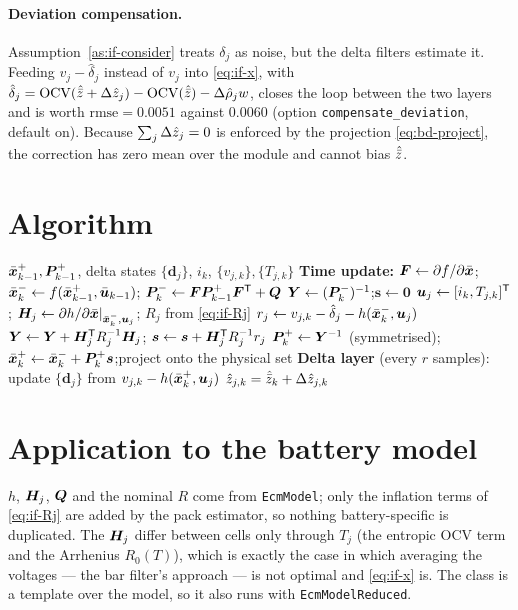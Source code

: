 \paragraph{Deviation compensation.} Assumption~\ref{as:if-consider} treats $\delta_j$ as noise,
but the delta filters estimate it. Feeding
$v_j - \hat\delta_j$ instead of $v_j$ into \eqref{eq:if-x}, with
$\hat\delta_j = \mathrm{OCV}(\hat{\bar{z}}+\Delta\hat{z}_j)-\mathrm{OCV}(\hat{\bar{z}}) -
\Delta\hat\rho_j w$, closes the loop between the two layers and is worth
$\text{rmse}=\num{0.0051}$ against \num{0.0060} (option
\texttt{compensate\_deviation}, default on). Because
$\sum_j\Delta\hat{z}_j = 0$ is enforced by the projection \eqref{eq:bd-project}, the correction
has zero mean over the module and cannot bias $\hat{\bar{z}}$.

\section{Algorithm}
\begin{algorithm}[H]
\caption{InfoFusion --- one sampling period $k$}
\begin{algorithmic}[1]
\Require $\bar{\bm{x}}^+_{k-1},\bm{P}^{+}_{k-1}$, delta states $\{\bm{d}_j\}$, $i_k$, $\{v_{j,k}\},\{T_{j,k}\}$
\State \textbf{Time update:} $\bm{F}\gets\partial f/\partial\bar{\bm{x}}$;\;
 $\bar{\bm{x}}^-_k\gets f(\bar{\bm{x}}^+_{k-1},\bar{\bm{u}}_{k-1})$;\; $\bm{P}^{-}_k\gets\bm{F}\bm{P}^{+}_{k-1}\bm{F}^{\mathsf{T}}+\bm{Q}$
\State $\bm{Y}\gets(\bm{P}^{-}_k)^{-1}$;\quad $\bm{s}\gets\bm{0}$
  \State $\bm{u}_j\gets[i_k,T_{j,k}]^{\mathsf{T}}$;\; $\bm{H}_j\gets\partial h/\partial\bar{\bm{x}}|_{\bar{\bm{x}}^-_k,\bm{u}_j}$;\;
         $R_j$ from \eqref{eq:if-Rj}
  \State $r_j \gets v_{j,k} - \hat\delta_{j} - h(\bar{\bm{x}}^-_k,\bm{u}_j)$
  \State $\bm{Y}\gets\bm{Y} + \bm{H}_j^{\mathsf{T}} R_j^{-1}\bm{H}_j$;\quad
         $\bm{s}\gets\bm{s} + \bm{H}_j^{\mathsf{T}} R_j^{-1} r_j$
\EndFor
\State $\bm{P}^{+}_k\gets\bm{Y}^{-1}$ (symmetrised);\quad
       $\bar{\bm{x}}^+_k\gets\bar{\bm{x}}^-_k+\bm{P}^{+}_k\bm{s}$;\quad project onto the physical set
\State \textbf{Delta layer} (every $r$ samples): update $\{\bm{d}_j\}$ from $v_{j,k}-h(\bar{\bm{x}}^+_k,\bm{u}_j)$
\Ensure $\hat{z}_{j,k}=\hat{\bar{z}}_k+\Delta\hat{z}_{j,k}$
\end{algorithmic}
\end{algorithm}

\section{Application to the battery model}
$h$, $\bm{H}_j$, $\bm{Q}$ and the nominal $R$ come from \texttt{EcmModel}; only the inflation terms of
\eqref{eq:if-Rj} are added by the pack estimator, so nothing battery-specific is duplicated. The
$\bm{H}_j$ differ between cells only through $T_j$ (the entropic OCV term and the Arrhenius
$R_0(T)$), which is exactly the case in which averaging the voltages --- the bar filter's
approach --- is not optimal and \eqref{eq:if-x} is. The class is a template over the model, so it
also runs with \texttt{EcmModelReduced}.

